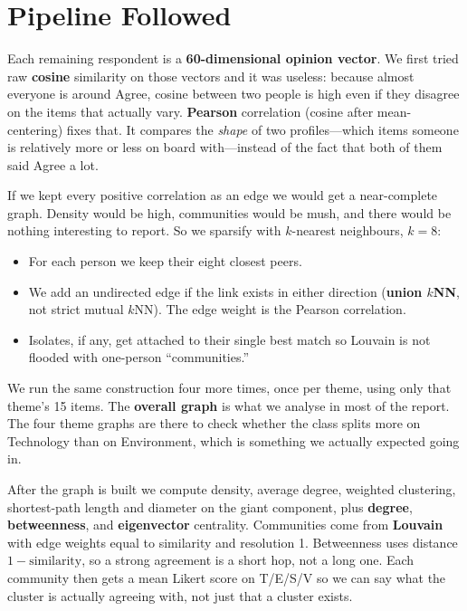\documentclass[11pt,a4paper]{article}
\begin{document}
\section{Pipeline Followed}

Each remaining respondent is a \textbf{60-dimensional opinion vector}. We first tried raw \textbf{cosine} similarity on those vectors and it was useless: because almost everyone is around Agree, cosine between two people is high even if they disagree on the items that actually vary. \textbf{Pearson} correlation (cosine after mean-centering) fixes that. It compares the \emph{shape} of two profiles---which items someone is relatively more or less on board with---instead of the fact that both of them said Agree a lot.

If we kept every positive correlation as an edge we would get a near-complete graph. Density would be high, communities would be mush, and there would be nothing interesting to report. So we sparsify with $k$-nearest neighbours, $k=8$:
\begin{itemize}
  \item For each person we keep their eight closest peers.
  \item We add an undirected edge if the link exists in either direction (\textbf{union $k$NN}, not strict mutual $k$NN). The edge weight is the Pearson correlation.
  \item Isolates, if any, get attached to their single best match so Louvain is not flooded with one-person ``communities.''
\end{itemize}

We run the same construction four more times, once per theme, using only that theme's 15 items. The \textbf{overall graph} is what we analyse in most of the report. The four theme graphs are there to check whether the class splits more on Technology than on Environment, which is something we actually expected going in.

After the graph is built we compute density, average degree, weighted clustering, shortest-path length and diameter on the giant component, plus \textbf{degree}, \textbf{betweenness}, and \textbf{eigenvector} centrality. Communities come from \textbf{Louvain} with edge weights equal to similarity and resolution 1. Betweenness uses distance $1 - \text{similarity}$, so a strong agreement is a short hop, not a long one. Each community then gets a mean Likert score on T/E/S/V so we can say what the cluster is actually agreeing with, not just that a cluster exists.
\end{document}
